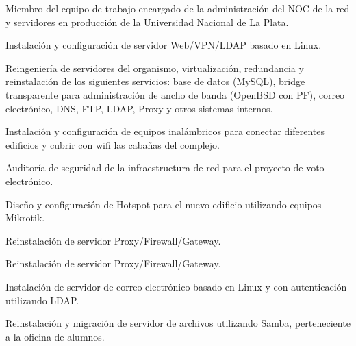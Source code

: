 \begin{cv}
Miembro del equipo de trabajo encargado de la administración del NOC de la red y
servidores en producción de la Universidad Nacional de La Plata.


Instalación y configuración de servidor Web/VPN/LDAP basado en Linux.


Reingeniería de servidores del organismo, virtualización, redundancia y reinstalación de
los siguientes servicios: base de datos (MySQL), bridge transparente para administración
de ancho de banda (OpenBSD con PF), correo electrónico, DNS, FTP, LDAP, Proxy y otros
sistemas internos. 


Instalación y configuración de equipos inalámbricos para conectar diferentes edificios y
cubrir con wifi las cabañas del complejo.


Auditoría de seguridad de la infraestructura de red para el proyecto de voto electrónico.


Diseño y configuración de Hotspot para el nuevo edificio utilizando equipos Mikrotik.


Reinstalación de servidor Proxy/Firewall/Gateway.


Reinstalación de servidor Proxy/Firewall/Gateway.


Instalación de servidor de correo electrónico basado en Linux y con autenticación
utilizando LDAP.


Reinstalación y migración de servidor de archivos utilizando Samba, perteneciente a la
oficina de alumnos.


\end{cv}
